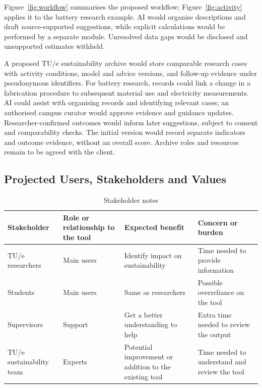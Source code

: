 \documentclass[11pt,a4paper]{article}
\begin{document}
Figure~\ref{fig:workflow} summarises the proposed workflow; Figure~\ref{fig:activity} applies it to the battery research example. AI would organise descriptions and draft source-supported suggestions, while explicit calculations would be performed by a separate module. Unresolved data gaps would be disclosed and unsupported estimates withheld.

A proposed TU/e sustainability archive would store comparable research cases with activity conditions, model and advice versions, and follow-up evidence under pseudonymous identifiers. For battery research, records could link a change in a fabrication procedure to subsequent material use and electricity measurements. AI could assist with organising records and identifying relevant cases; an authorised campus curator would approve evidence and guidance updates. Researcher-confirmed outcomes would inform later suggestions, subject to consent and comparability checks. The initial version would record separate indicators and outcome evidence, without an overall score. Archive roles and resources remain to be agreed with the client.




\FloatBarrier
\subsection{Projected Users, Stakeholders and Values}
\begin{table}[ht]
\centering
\begin{tabularx}{\textwidth}{|X|X|X|X|}
\hline
\textbf{Stakeholder} & \textbf{Role or relationship to the tool} & 
\textbf{Expected benefit} & \textbf{Concern or burden} \\
\hline

TU/e researchers &
Main users &
Identify impact on sustainability &
Time needed to provide information \\
\hline

Students &
Main users &
Same as researchers &
Possible overreliance on the tool \\
\hline

Supervisors &
Support &
Get a better understanding to help &
Extra time needed to review the output 
\\
\hline

TU/e sustainability team &
Experts &
Potential improvement or addition to the existing tool &
Time needed to understand and review the tool \\
\hline

\end{tabularx}
\caption{Stakeholder notes}
\label{tab:stakeholders}
\end{table}
\end{document}
